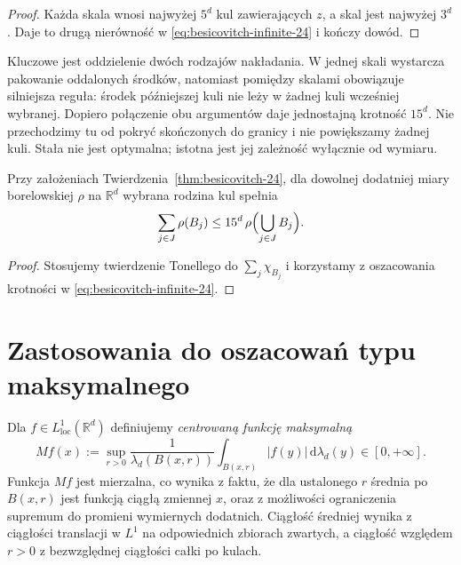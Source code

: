 \begin{proof}
Każda skala wnosi najwyżej $5^d$ kul
zawierających $z$, a skal jest najwyżej $3^d$.
Daje to drugą nierówność w
\eqref{eq:besicovitch-infinite-24} i kończy dowód.
\end{proof}

\begin{uwaga}
Kluczowe jest oddzielenie dwóch rodzajów nakładania.
W jednej skali wystarcza pakowanie oddalonych
środków, natomiast pomiędzy skalami obowiązuje
silniejsza reguła: środek późniejszej kuli nie leży
w żadnej kuli wcześniej wybranej. Dopiero
połączenie obu argumentów daje jednostajną
krotność $15^d$. Nie przechodzimy tu od pokryć
skończonych do granicy i nie powiększamy żadnej kuli.
Stała nie jest optymalna; istotna jest jej
zależność wyłącznie od wymiaru.
\end{uwaga}

\begin{wniosek}
\label{cor:besicovitch-measure-infinite-24}
Przy założeniach Twierdzenia~\ref{thm:besicovitch-24},
dla dowolnej dodatniej miary borelowskiej $\rho$
na $\mathbb R^d$ wybrana rodzina kul spełnia
\[
 \sum_{j\in J}\rho(B_j)
 \le15^d\,\rho\Bigl(\bigcup_{j\in J}B_j\Bigr).
\]
\end{wniosek}
\begin{proof}
Stosujemy twierdzenie Tonellego do
$\sum_j\chi_{B_j}$ i korzystamy z oszacowania
krotności w \eqref{eq:besicovitch-infinite-24}.
\end{proof}

\section{Zastosowania do oszacowań typu maksymalnego}
\begin{definicja}
\label{def:HL-max-24}
Dla $f\in L^1_{\mathrm{loc}}(\mathbb R^d)$ definiujemy
\emph{centrowaną funkcję maksymalną}
\[
 Mf(x):=\sup_{r>0}\frac1{\lambda_d(B(x,r))}
 \int_{B(x,r)}|f(y)|\,\mathrm d\lambda_d(y)
 \in[0,+\infty].
\]
Funkcja $Mf$ jest mierzalna, co wynika z faktu, że dla
ustalonego $r$ średnia po $B(x,r)$ jest funkcją ciągłą
zmiennej $x$, oraz z możliwości ograniczenia supremum
do promieni wymiernych dodatnich. Ciągłość średniej wynika
z ciągłości translacji w $L^1$ na odpowiednich zbiorach
zwartych, a ciągłość względem $r>0$ z bezwzględnej
ciągłości całki po kulach.
\end{definicja}


